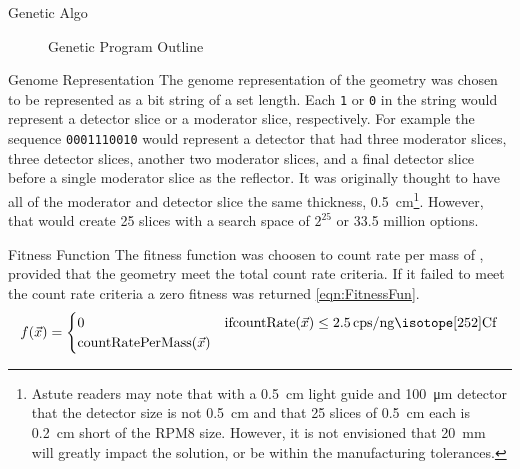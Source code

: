 \begin{frame}{Genetic Algo}
\begin{figure}
\begin{algorithmic}
		\ENDFOR
		\ENDFOR
	\ENDWHILE
\end{algorithmic}
\caption{Genetic Program Outline}
\label{AlgoOutline}
\end{figure}
\end{frame}
\begin{frame}[fragile]{Genome Representation}
The genome representation of the geometry was chosen to be represented as a bit string of a set length.
Each \verb+1+ or \verb+0+ in the string would represent a detector slice or a moderator slice, respectively.
For example the sequence \verb+0001110010+ would represent a detector that had three moderator slices, three detector slices, another two moderator slices, and a final detector slice before a single moderator slice as the reflector.
It was originally thought to have all of the moderator and detector slice the same thickness, \SI{0.5}{\centi \meter}\footnote{Astute readers may note that with a \SI{0.5}{\centi \meter} light guide and \SI{100}{\micro \meter} detector that the detector size is not \SI{0.5}{\centi\meter} and that 25 slices of \SI{0.5}{\centi\meter} each is \SI{0.2}{\centi\meter} short of the RPM8 size. However, it is not envisioned that \SI{20}{\milli\meter} will greatly impact the solution, or be within the manufacturing tolerances. }.
However, that would create 25 slices with a search space of $2^{25}$ or 33.5 million options.
\end{frame}
\begin{frame}{Fitness Function}
The fitness function was choosen to count rate per mass of , provided that the geometry meet the total count rate criteria.
If it failed to meet the count rate criteria a zero fitness was returned \eqref{eqn:FitnessFun}.
\begin{align}
    \label{eqn:FitnessFun}
    f(\vec{x})
    = \begin{cases}
    0 & \text{if} \text{countRate}(\vec{x}) \leq \SI{2.5}{cps\per\nano\gram\iso[252]{Cf}} \\
    \text{countRatePerMass}(\vec{x})
    \end{cases}
\end{align}
\end{frame}
